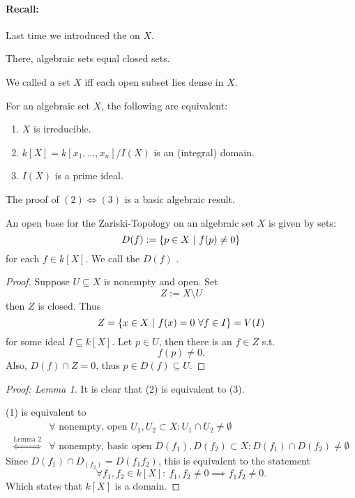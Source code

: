 
\paragraph{Recall:} Last time we introduced the  on $X$.

There, algebraic sets equal closed sets.

We called a set $X$  iff each open subset lies dense in $X$.


\begin{lemma}
	For an algebraic set $X$, the following are equivalent:
	\begin{enumerate}[(1)]
		\item $X$ is irreducible.
		\item $k[X] = k[x_1, \ldots, x_n] / I(X)$ is an (integral) domain.
		\item $I(X)$ is a prime ideal.
	\end{enumerate}
\end{lemma}
The proof of $(2) \iff (3)$ is a basic algebraic result.

\begin{lemma}
	An open base for the Zariski-Topology on an algebraic set $X$ is given by sets:
	\[ D(f) := \left\lbrace p \in X ~ | ~ f(p) \neq 0\right\rbrace \]
	for each $f \in k[X]$. We call the $D(f)$ .
\end{lemma}
\begin{proof}
	Suppose $U \subseteq X$ is nonempty and open. Set
	\[ Z:= X \setminus U\]
	then $Z$ is closed.
	Thus
	\[ Z = \left\lbrace x \in X ~ | ~ f(x) = 0 ~\forall f \in  I\right\rbrace =V(I) \]
	for some ideal $I \subseteq k[X]$. Let $p \in U$, then there is an $f \in Z$ s.t.
	\[f (p) \neq 0. \]
	Also, $D(f) \cap Z = 0$, thus $p \in D(f) \subseteq U$.
\end{proof}

\begin{proof}[Proof: Lemma 1]
	It is clear that (2) is equivalent to (3).
	
	(1) is equivalent to
	\begin{align*}
	& \forall \text{ nonempty, open }U_1, U_2\subset X: U_1\cap U_2 \neq \emptyset\\
\overset{\text{Lemma 2}}{\iff}	& \forall \text{ nonempty, basic open }D(f_1), D(f_2)\subset X: D(f_1) \cap D(f_2) \neq \emptyset
	\end{align*}
	Since $D(f_1)\cap D_(f_2) = D(f_1f_2)$, this is equivalent to the statement
	\[\forall f_1, f_2 \in k[X]:~ f_1, f_2 \neq 0 \implies f_1f_2 \neq 0. \]
	Which states that $k[X]$ is a domain.
\end{proof}

